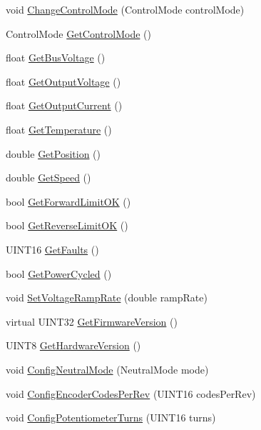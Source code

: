 \begin{DoxyCompactItemize}
void \hyperlink{classCANJaguar_ababe0fdb6bdab82c95dcb9c0a9b660d0}{\-Change\-Control\-Mode} (\-Control\-Mode control\-Mode)
\item 
\-Control\-Mode \hyperlink{classCANJaguar_a0182b7175a6ea7e2d28dc6b331f7dbff}{\-Get\-Control\-Mode} ()
\item 
float \hyperlink{classCANJaguar_a9ab46336737e40a6d765f839cd43db61}{\-Get\-Bus\-Voltage} ()
\item 
float \hyperlink{classCANJaguar_a9c8ff9ed5747ce175a5215d2b18e973d}{\-Get\-Output\-Voltage} ()
\item 
float \hyperlink{classCANJaguar_a1845e946d4be9219d7b3ac3c6152f5b8}{\-Get\-Output\-Current} ()
\item 
float \hyperlink{classCANJaguar_aa58c2cc33eeebbb6684227c5500d7cbc}{\-Get\-Temperature} ()
\item 
double \hyperlink{classCANJaguar_a87df60fbda9e2cb8f6f8072f68476444}{\-Get\-Position} ()
\item 
double \hyperlink{classCANJaguar_afafb32f44cd1525e351615d6999f59f1}{\-Get\-Speed} ()
\item 
bool \hyperlink{classCANJaguar_a0f11a7f13319f448e493fad2dc47e71b}{\-Get\-Forward\-Limit\-O\-K} ()
\item 
bool \hyperlink{classCANJaguar_a0efb888bb3239cad4ea0f27890998dff}{\-Get\-Reverse\-Limit\-O\-K} ()
\item 
\-U\-I\-N\-T16 \hyperlink{classCANJaguar_a85127197e529c31e21c7f7dd601d1b29}{\-Get\-Faults} ()
\item 
bool \hyperlink{classCANJaguar_a37066e9210891a674ce80bee695c5ba5}{\-Get\-Power\-Cycled} ()
\item 
void \hyperlink{classCANJaguar_a73540797125ae698a72806f9cf10330d}{\-Set\-Voltage\-Ramp\-Rate} (double ramp\-Rate)
\item 
virtual \-U\-I\-N\-T32 \hyperlink{classCANJaguar_af0de370823437c4f9db998fcb009431e}{\-Get\-Firmware\-Version} ()
\item 
\-U\-I\-N\-T8 \hyperlink{classCANJaguar_a872d409492668ef44438dfe73bdb5efd}{\-Get\-Hardware\-Version} ()
\item 
void \hyperlink{classCANJaguar_a1f0512aa6c0b6eb60d37c3d8a3fd0f57}{\-Config\-Neutral\-Mode} (\-Neutral\-Mode mode)
\item 
void \hyperlink{classCANJaguar_a1b3155962cb795c6c5ee31e593ad97ec}{\-Config\-Encoder\-Codes\-Per\-Rev} (\-U\-I\-N\-T16 codes\-Per\-Rev)
\item 
void \hyperlink{classCANJaguar_a4c7f1f58c5dd5f3af20ed6867573df19}{\-Config\-Potentiometer\-Turns} (\-U\-I\-N\-T16 turns)

\end{DoxyCompactItemize}
